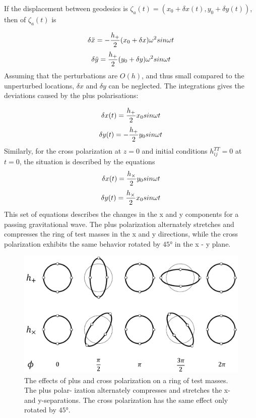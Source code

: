 \documentclass[binding=0.6cm, LaM]{sapthesis}
\begin{document}
If the displacement between geodesics is $\zeta_a (t) = (x_0 + \delta x(t), y_0 + \delta y(t))$, then of $\zeta_a (t)$ is 

\begin{equation}
\delta {\ddot x} = - {{h_{+}} \over 2} (x_0 + \delta x) \omega ^2 sin \omega t
\end{equation}
\begin{equation}
\delta {\ddot y} =  {{h_{+}} \over 2} (y_0 + \delta y) \omega ^2 sin \omega t
\end{equation}
Assuming that the perturbations are $O(h)$, and thus small compared to the unperturbed locations, $\delta x$ and $\delta y$ can be neglected.
The integrations gives the deviations caused by the plus polarisations:

\begin{equation}
\delta x(t) =  {{h_{+}} \over 2} x_0 sin \omega t
\end{equation}
\begin{equation}
\delta y(t) = - {{h_{+}} \over 2} y_0  sin \omega t
\end{equation}
Similarly, for the cross polarization at $z=0$ and initial conditions $h_{ij}^{TT} = 0$ at $t= 0$, the situation is described by the equations
\begin{equation}
\delta x(t) =  {{h_{\times}} \over 2} y_0 sin \omega t
\end{equation}
\begin{equation}
\delta y(t) =  {{h_{\times}} \over 2} x_0  sin \omega t
\end{equation}
This set of equations describes the changes in the x and y components for a passing gravitational wave. 
The plus polarization alternately stretches and compresses the ring of test masses in the x and y directions, while the cross polarization exhibits the same behavior rotated by $\ang{45}$ in the x - y
 plane. 

\begin{figure}
\includegraphics[scale=1]{ring}
\centering
\caption{The effects of plus and cross polarization on a ring of test masses. The plus polar- ization alternately compresses and stretches the x- and y-separations. 
The cross polarization has the same effect only rotated by  $\ang{45}$.}
\label{fig:ring}
\end{figure}
\end{document}
